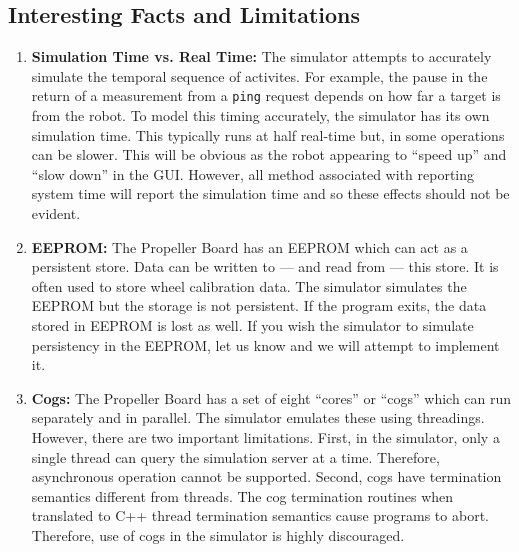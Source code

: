 \documentclass[a4paper]{article}
\begin{document}
\subsection{Interesting Facts and Limitations}

\begin{enumerate}
\item {\bfseries Simulation Time vs. Real Time:} The simulator
  attempts to accurately simulate the temporal sequence of
  activites. For example, the pause in the return of a measurement
  from a \verb+ping+ request depends on how far a target is from the
  robot. To model this timing accurately, the simulator has its own
  simulation time. This typically runs at half real-time but, in some
  operations can be slower. This will be obvious as the robot
  appearing to ``speed up'' and ``slow down'' in the GUI. However, all
  method associated with reporting system time will report the
  simulation time and so these effects should not be evident.
\item {\bfseries EEPROM:} The Propeller Board has an EEPROM which can
  act as a persistent store. Data can be written to --- and read from
  --- this store. It is often used to store wheel calibration
  data. The simulator simulates the EEPROM but the storage is not
  persistent. If the program exits, the data stored in EEPROM is lost
  as well. If you wish the simulator to simulate persistency in the
  EEPROM, let us know and we will attempt to implement it.
\item {\bfseries Cogs:} The Propeller Board has a set of eight
  ``cores'' or ``cogs'' which can run separately and in parallel. The
  simulator emulates these using threadings. However, there are two
  important limitations. First, in the simulator, only a single thread
  can query the simulation server at a time. Therefore, asynchronous
  operation cannot be supported. Second, cogs have termination
  semantics different from threads. The cog termination routines when
  translated to C++ thread termination semantics cause programs to
  abort. Therefore, use of cogs in the simulator is highly
  discouraged.
\end{enumerate}
\end{document}

